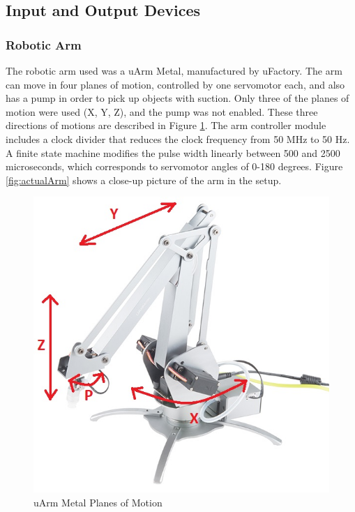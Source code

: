 \documentclass{article}
\begin{document}
    \subsection{Input and Output Devices}

        \subsubsection{Robotic Arm}
        The robotic arm used was a uArm Metal, manufactured by uFactory. The arm can move in four planes of motion, controlled by one servomotor each, and also has a pump in order to pick up objects with suction. Only three of the planes of motion were used (X, Y, Z), and the pump was not enabled. These three directions of motions are described in Figure \ref{fig:armMotion}. The arm controller module includes a clock divider that reduces the clock frequency from 50 MHz to 50 Hz. A finite state machine modifies the pulse width linearly between 500 and 2500 microseconds, which corresponds to servomotor angles of 0-180 degrees. Figure \ref{fig:actualArm} shows a close-up picture of the arm in the setup.
        
        \begin{figure}[H]
            \begin{center}
                \includegraphics[scale=1]{armMotion.jpg}
                \caption{uArm Metal Planes of Motion}
                \label{fig:armMotion}
            \end{center}
        \end{figure}
        
\end{document}
